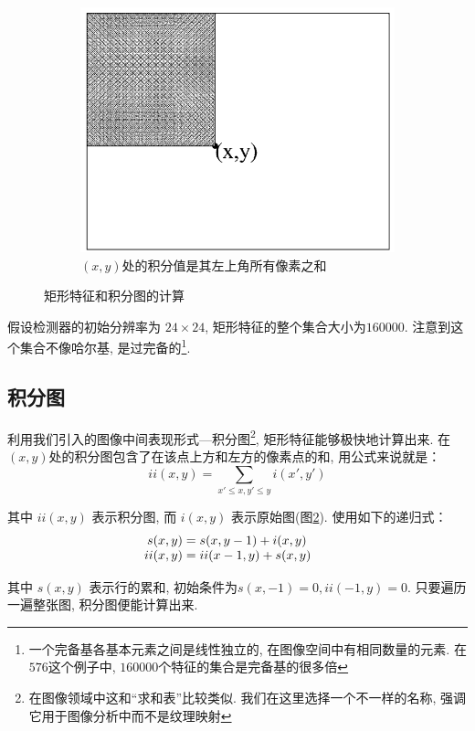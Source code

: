 \documentclass[a4paper,utf8,11pt, onecolumn]{ctexart}
\renewcommand{\captionlabelfont}{\kaishu\zihao{5}}
\begin{document}
\begin{figure}[!htb]
\begin{subfigure}{0.3\textwidth}
\includegraphics[width=\textwidth]{int.png}
\renewcommand{\captionlabelfont}{\kaishu\zihao{6}}
\caption{$(x,y)$处的积分值是其左上角所有像素之和}
\label{fig:int}
\end{subfigure}
\caption{矩形特征和积分图的计算}
\end{figure}

假设检测器的初始分辨率为 $24\times24$, 矩形特征的整个集合大小为$160000$. 注意到这个集合不像哈尔基, 是过完备的\footnote{一个完备基各基本元素之间是线性独立的, 在图像空间中有相同数量的元素. 在$576$这个例子中, $160000$个特征的集合是完备基的很多倍}.

\subsection{积分图}
利用我们引入的图像中间表现形式---积分图\footnote{在图像领域中这和``求和表''比较类似\citep{crow1984summed}. 我们在这里选择一个不一样的名称, 强调它用于图像分析中而不是纹理映射}, 矩形特征能够极快地计算出来. 在$(x, y)$处的积分图包含了在该点上方和左方的像素点的和, 用公式来说就是：
\[
    ii(x, y)= \sum_{x'\leq x, y'\leq y} i(x', y')
\]

其中 $ii(x, y)$ 表示积分图, 而 $i(x, y)$ 表示原始图(图\ref{fig:int}). 使用如下的递归式：
\[
    \begin{array}{r@{}>{{}}l@{\qquad}r@{}>{{}}l}
        s(x,y)&=s(x,y-1)+i(x,y)\\
        ii(x,y)&=ii(x-1,y)+s(x,y)
    \end{array}
\]

其中 $s(x, y)$ 表示行的累和, 初始条件为$s(x,-1)=0, ii(-1,y)=0$. 只要遍历一遍整张图, 积分图便能计算出来. 
\end{document}
